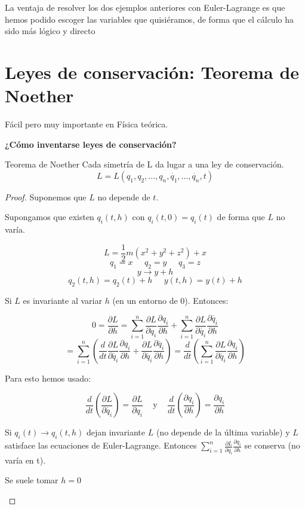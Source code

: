La ventaja de resolver los dos ejemplos anteriores con Euler-Lagrange es que hemos podido escoger las variables que quisiéramos, de forma que el cálculo ha sido más lógico y directo\\



\section{Leyes de conservación: Teorema de Noether}
Fácil pero muy importante en Física teórica.

\textbf{¿Cómo inventarse leyes de conservación?}

\begin{theorem}{Teorema de Noether}
Cada simetría de L da lugar a una ley de conservación.
$$ L = L(q_1,q_2,...,q_n,\dot{q_1},...,\dot{q_n},t) $$
\end{theorem}
\begin{proof}
Suponemos que $L$ no depende de $t$.

Supongamos que existen $q_i(t,h)$ con $q_i(t,0) = q_i(t)$ de forma que $L$ no varía.

$$ L = \frac{1}{2} m (x^2 + y^2 + z^2 ) + x $$
$$ q_1 = x \;\;\;\;\; q_2 = y \;\;\;\;\; q_3 = z $$
$$ y \rightarrow y + h $$
$$ q_2(t,h) = q_2(t) + h \;\;\;\;\;  y(t,h) = y(t) + h $$

Si $L$ es invariante al variar $h$ (en un entorno de 0). Entonces:

$$0 = \frac{\partial L}{\partial h} = \sum_{i = 1}^n \frac{\partial L}{\partial q_i} \frac{\partial q_i}{\partial h} + \sum_{i = 1}^n \frac{\partial L}{\partial \dot{q_i}} \frac{\partial \dot{q_i}}{\partial h}
$$
$$= \sum_{i = 1}^n \left(\frac{d}{dt} \frac{\partial L}{\partial \dot{q_i}} \frac{\partial q_i}{\partial h} + \frac{\partial L}{\partial \dot{q_i}} \frac{\partial \dot{q_i}}{\partial h}\right)
= \frac{d}{dt} \left(\sum_{i = 1}^n \frac{\partial L}{\partial \dot{q_i}} \frac{\partial q_i}{\partial h}\right)$$

Para esto hemos usado:

$$ \frac{d}{dt}\left( \frac{\partial L}{\partial \dot{q_i}}\right) =  \frac{\partial L}{\partial q_i} \;\;\; \text{ y } \;\;\; \frac{d}{dt}\left( \frac{\partial q_i}{\partial h}\right) = \frac{\partial q_i}{\partial h}$$


Si $q_i(t) \rightarrow q_i(t,h)$ dejan invariante $L$ (no depende de la última variable) y $L$ satisface las ecuaciones de Euler-Lagrange. Entonces $\sum_{i = 1}^n \frac{\partial L}{\partial \dot{q_i}} \frac{\partial q_i}{\partial h}$ se conserva (no varía en t).

\begin{obs} Se suele tomar $h=0$ \end{obs}

\end{proof}


